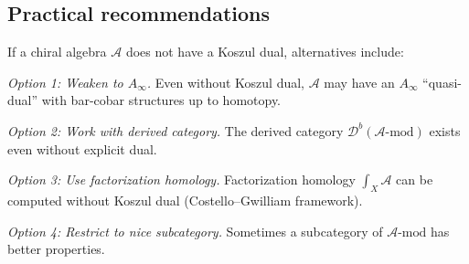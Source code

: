 \subsection{Practical recommendations}

\begin{remark}\label{rem:no-dual-alternatives}
If a chiral algebra $\mathcal{A}$ does not have a Koszul dual, alternatives include:

\emph{Option 1: Weaken to $A_\infty$.}
Even without Koszul dual, $\mathcal{A}$ may have an $A_\infty$ ``quasi-dual'' with 
bar-cobar structures up to homotopy.

\emph{Option 2: Work with derived category.}
The derived category $\mathcal{D}^b(\mathcal{A}\text{-mod})$ exists even without 
explicit dual.

\emph{Option 3: Use factorization homology.}
Factorization homology $\int_X \mathcal{A}$ can be computed without Koszul dual 
(Costello--Gwilliam framework).

\emph{Option 4: Restrict to nice subcategory.}
Sometimes a subcategory of $\mathcal{A}\text{-mod}$ has better properties.
\end{remark}

